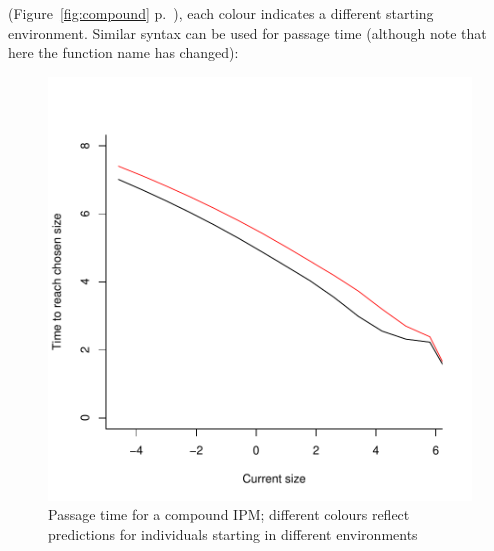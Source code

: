 \documentclass{article}
\begin{document}
(Figure~\ref{fig:compound} p.~\pageref{fig:compound}), 
each colour indicates a different starting environment. Similar syntax can be used for passage time (although note that here the function name has changed): 
\begin{figure}
\begin{center}
\includegraphics{IPMpack_Vignette-fig5}
\end{center}
\caption{Passage time for a compound IPM;   different colours reflect predictions for individuals starting in different environments}
\label{fig:five}
\end{figure}
\end{document}
